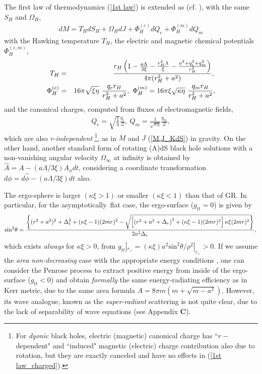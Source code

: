 \documentclass[preprint,aps,tightenlines,showkeys,nofootinbib,superscriptaddress]{revtex4}
\newcommand{\beq}{\begin{eqnarray}}
\newcommand{\eeq}{\end{eqnarray}}
\newcommand{\De}{\Delta}
\newcommand{\ka}{\kappa}
\newcommand{\La}{{\Lambda}}
\newcommand{\Om}{{\Omega}}
\newcommand{\no}{{\nonumber}}
\newcommand{\f}{\frac}
\newcommand{\asy}{asymptotically}
\begin{document}
The first law of thermodynamics (\ref{1st law}) is extended as (cf. \cite{Cald:1999}), with the same $S_H$ and $\Om_H$,
\beq
dM=T_H dS_H +\Om_{H} dJ+\Phi^{(e)}_H dQ_e+\Phi^{(m)}_H dQ_m
\label{1st law_charged}
\eeq
with the Hawking temperature $T_H$, the electric and magnetic chemical potentials $\Phi^{(e,m)}_H$,
\beq
T_H&=&\f{r_H \left(1-\f{a \La}{3 \xi}-\f{r_H^2 \La}{\xi}-\f{a^2+q_e^2+q_m^2}{r_H^2} \right)}{4 \pi(r_H^2+a^2)}, \no \\
\Phi^{(e)}_H&=&16 \pi \sqrt{\xi \eta}~\f{q_e r_H}{r_H^2+a^2}, ~
\Phi^{(m)}_H=16 \pi \xi \sqrt{\ka \eta}~\f{q_m r_H}{r_H^2+a^2},
\eeq
and the canonical charges, computed from fluxes of electromagnetic fields,
\beq
Q_e=\sqrt{\f{\xi}{\eta}}\f{q_e}{\Xi}, ~Q_m=\f{1}{\sqrt{\ka \eta}}\f{q_m}{\Xi},
\eeq
which are also {\it r-independent} \footnote{For {\it dyonic} black holes, electric (magnetic) canonical charge has ``$r-$dependent" and ``induced" magnetic (electric) charge contribution also due to rotation, but they are exactly canceled and have no effects in (\ref{1st law_charged}).}, as in $M$ and $J$ (\ref{M,J_KdS}) in gravity.
On the other hand, another standard form of rotating (A)dS black hole solutions
with a non-vanishing angular velocity $\Om_{\infty}$ at infinity
is obtained by
$\widehat{A}=A-({a \La}/{3 \xi}) A_{\phi}dt$,
considering a coordinate transformation $d \phi=d \widehat{\phi}-(a \La/3 \xi)dt$ also.

The ergo-sphere is larger $(\ka \xi >1)$ or smaller $(\ka \xi <1)$ than that of GR. In particular, for the \asy~flat case, the ergo-surface ($g_{tt}=0$) is given by
\beq
\mbox{sin}^2\theta=\f{
\left\{ (r^2+a^2)^2+\De_r^2+(\ka \xi-1) (2mr)^2
-\sqrt{\left[ \left(r^2+a^2+\De_r \right)^2+ (\ka \xi-1) (2mr)^2 \right] \ka \xi (2mr)^2} \right\}
}{2 a^2 \De_r},\no \\
\eeq
which exists {\it always} for $\ka \xi>0$, from $g_{tt}|_{r_+}=(\ka \xi) a^2 \mbox{sin}^2 \theta /\rho^{2}|_{r_+}>0$. If we assume the {\it area non-decreasing} case with the appropriate energy conditions \cite{Hawk:1971}, one can consider the Penrose process \cite{Penr:1969} to extract positive energy from inside of the ergo-surface ($g_{tt}< 0$) and obtain {\it formally} the same energy-radiating efficiency as in Kerr metric, due to the same area formula $A=8 \pi m (m+\sqrt{m-a^2})$. However, its wave analogue, known as the {\it super-radiant} scattering is not quite clear, due to the lack of separability of wave equations (see Appendix {\bf C}).
\end{document}
